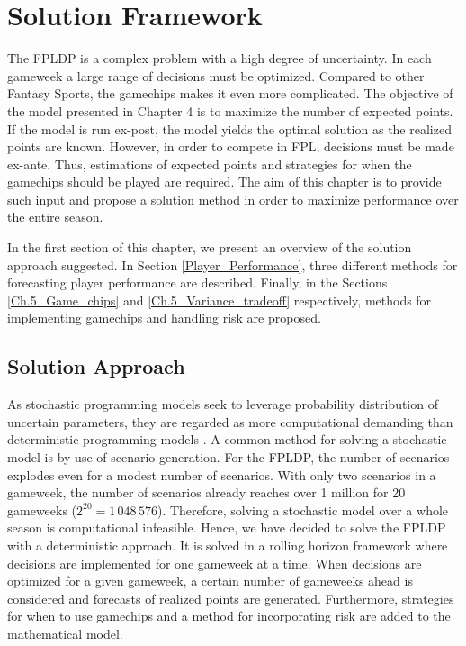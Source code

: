 

\chapter{Solution Framework} \label{chapter_solution_approach}

The FPLDP is a complex problem with a high degree of uncertainty. In each gameweek a large range of decisions must be optimized. Compared to other Fantasy Sports, the gamechips makes it even more complicated. The objective of the model presented in Chapter 4 is to maximize the number of expected points. If the model is run ex-post, the model yields the optimal solution as the realized points are known. However, in order to compete in FPL, decisions must be made ex-ante. Thus, estimations of expected points and strategies for when the gamechips should be played are required. The aim of this chapter is to provide such input and propose a solution method in order to maximize performance over the entire season. 

\newpar
In the first section of this chapter, we present an overview of the solution approach suggested. In Section \ref{Player_Performance}, three different methods for forecasting player performance are described. Finally, in the Sections \ref{Ch.5_Game_chips} and \ref{Ch.5_Variance_tradeoff} respectively, methods for implementing gamechips and handling risk are proposed.


\section{Solution Approach}

As stochastic programming models seek to leverage probability distribution of uncertain parameters, they are regarded as more computational demanding than deterministic programming models \citep{Shapiro}. A common method for solving a stochastic model is by use of scenario generation. For the FPLDP, the number of scenarios explodes even for a modest number of scenarios. With only two scenarios in a gameweek, the number of scenarios already reaches over 1 million for 20 gameweeks ($2^{20} = 1\,048\,576$). Therefore, solving a stochastic model over a whole season is computational infeasible. Hence, we have decided to solve the FPLDP with a deterministic approach. It is solved in a rolling horizon framework where decisions are implemented for one gameweek at a time. When decisions are optimized for a given gameweek, a certain number of gameweeks ahead is considered and forecasts of realized points are generated. Furthermore, strategies for when to use gamechips and a method for incorporating risk are added to the mathematical model.
\newpar


